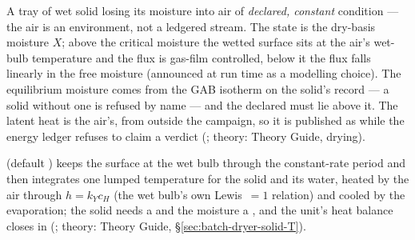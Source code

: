 \documentclass[11pt,a4paper]{article}
\begin{document}
A tray of wet solid losing its moisture into air of \emph{declared,
constant} condition --- the air is an environment, not a ledgered stream.
The state is the dry-basis moisture $X$; above the critical moisture the
wetted surface sits at the air's wet-bulb temperature and the flux is
gas-film controlled, below it the flux falls linearly in the free moisture
(announced at run time as a modelling choice).  The equilibrium moisture
comes from the GAB isotherm on the solid's  record ---
a solid without one is refused by name --- and the declared
 must lie above it.  The latent heat is the air's,
from outside the campaign, so it is published as 
while the energy ledger refuses to claim a verdict
(; theory: Theory Guide, drying).

 (default ) keeps the surface at the wet
bulb through the constant-rate period and then integrates one lumped temperature for the solid and its
water, heated by the air through $h=k_Y c_H$ (the wet bulb's own Lewis~$=1$ relation) and cooled by the
evaporation; the solid needs a  and the moisture a , and
the unit's heat balance closes in 
(; theory: Theory Guide, \S\ref{sec:batch-dryer-solid-T}).

\subsection{}
\end{document}
